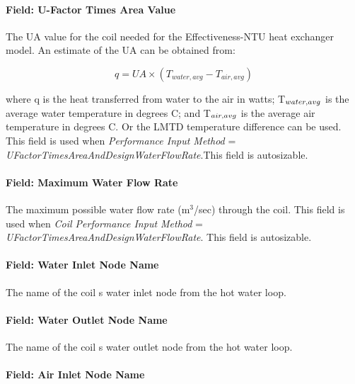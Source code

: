 \paragraph{Field: U-Factor Times Area Value}\label{field-u-factor-times-area-value}

The UA value for the coil needed for the Effectiveness-NTU heat exchanger model. An estimate of the UA can be obtained from:

\begin{equation}
q = UA \times ({T_{water,avg}} - {T_{air,avg}})
\end{equation}

where q is the heat transferred from water to the air in watts; T\(_{water,\\ avg}\) is the average water temperature in degrees C; and T\(_{air,\\ avg}\) is the average air temperature in degrees C. Or the LMTD temperature difference can be used. This field is used when \emph{Performance Input Method} = \emph{UFactorTimesAreaAndDesignWaterFlowRate}.This field is autosizable.

\paragraph{Field: Maximum Water Flow Rate}\label{field-maximum-water-flow-rate-000}

The maximum possible water flow rate (m\(^{3}\)/sec) through the coil. This field is used when \emph{Coil Performance Input Method} = \emph{UFactorTimesAreaAndDesignWaterFlowRate}. This field is autosizable.

\paragraph{Field: Water Inlet Node Name}\label{field-water-inlet-node-name-1-000}

The name of the coil s water inlet node from the hot water loop.

\paragraph{Field: Water Outlet Node Name}\label{field-water-outlet-node-name-1-000}

The name of the coil s water outlet node from the hot water loop.

\paragraph{Field: Air Inlet Node Name}\label{field-air-inlet-node-name-1-003}

